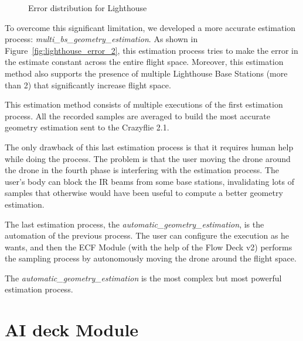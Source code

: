 \begin{figure}[h]
    \centering
    \qquad
    \caption{Error distribution for Lighthouse}\label{fig:lighthouse_error}
\end{figure}

To overcome this significant limitation, we developed a more accurate estimation process: \textit{multi\_bs\_geometry\_estimation}. 
As shown in Figure~\ref{fig:lighthouse_error_2}, this estimation process tries to make the error in the estimate constant across the entire flight space. 
Moreover, this estimation method also supports the presence of multiple Lighthouse Base Stations (more than 2) that significantly increase flight space.

This estimation method consists of multiple executions of the first estimation process.
All the recorded samples are averaged to build the most accurate geometry estimation sent to the Crazyflie 2.1.


The only drawback of this last estimation process is that it requires human help while doing the process. 
The problem is that the user moving the drone around the drone in the fourth phase is interfering with the estimation process. 
The user's body can block the IR beams from some base stations, invalidating lots of samples that otherwise would have been useful to compute a better geometry estimation.

The last estimation process, the \textit{automatic\_geometry\_estimation}, is the automation of the previous process. 
The user can configure the execution as he wants, and then the ECF Module (with the help of the Flow Deck v2) performs the sampling process by autonomously moving the drone around the flight space.

The \textit{automatic\_geometry\_estimation} is the most complex but most powerful estimation process.

\section{AI deck Module}\label{sec:module_ai_deck}


